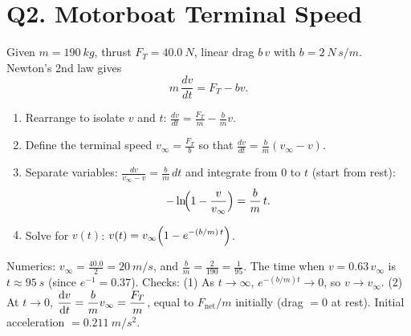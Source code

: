 \documentclass[11pt]{article}
\newcommand{\ans}[1]{\boxed{\displaystyle #1}}
\begin{document}
\section*{Q2. Motorboat Terminal Speed}
Given $m=\SI{190}{kg}$, thrust $F_T=\SI{40.0}{N}$, linear drag $b\,v$ with $b=\SI{2}{N\,s/m}$. Newton's 2nd law gives
\[ m\,\frac{dv}{dt}=F_T-bv. \]
\begin{enumerate}[label=(\roman*)]
  \item Rearrange to isolate $v$ and $t$: $\displaystyle \frac{dv}{dt}=\frac{F_T}{m}-\frac{b}{m}v$.
  \item Define the terminal speed $\displaystyle v_\infty=\frac{F_T}{b}$ so that $\frac{dv}{dt}=\frac{b}{m}(v_\infty-v)$.
  \item Separate variables: $\displaystyle \frac{dv}{v_\infty-v}=\frac{b}{m}\,dt$ and integrate from $0$ to $t$ (start from rest):
  \[ -\ln\!\Bigl(1-\frac{v}{v_\infty}\Bigr)=\frac{b}{m}\,t. \]
  \item Solve for $v(t)$: $\displaystyle v(t)=v_\infty\Bigl(1-e^{-(b/m)\,t}\Bigr)$.
\end{enumerate}
Numerics: $\displaystyle v_\infty=\frac{40.0}{2}=\ans{\SI{20}{m/s}}$, and $\displaystyle \frac{b}{m}=\frac{2}{190}=\frac{1}{95}$. The time when $v=0.63\,v_\infty$ is $t\approx\ans{\SI{95}{s}}$ (since $e^{-1}=0.37$).
\smallskip
Checks: (1) As $t\to\infty$, $e^{-(b/m)t}\to0$, so $v\to v_\infty$. (2) At $t\to0$, $\displaystyle \dv{v}{t}=\frac{b}{m}v_\infty=\frac{F_T}{m}$, equal to $F_{\text{net}}/m$ initially (drag $=0$ at rest). Initial acceleration $=\ans{\SI{0.211}{m/s^2}}$.

\begin{center}
\end{center}
\end{document}
